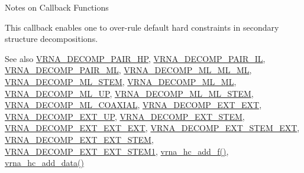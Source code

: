 \begin{DoxyRefDesc}{Notes on Callback Functions}
\item[\hyperlink{callbacks__callbacks000001}{Notes on Callback Functions}]This callback enables one to over-\/rule default hard constraints in secondary structure decompositions. \end{DoxyRefDesc}


\begin{DoxySeeAlso}{See also}
\hyperlink{group__constraints_ga8bd41ebc8039378d242e4e8c273716a5}{V\+R\+N\+A\+\_\+\+D\+E\+C\+O\+M\+P\+\_\+\+P\+A\+I\+R\+\_\+\+HP}, \hyperlink{group__constraints_gaeab04f34d7730cff2d651d782f95d857}{V\+R\+N\+A\+\_\+\+D\+E\+C\+O\+M\+P\+\_\+\+P\+A\+I\+R\+\_\+\+IL}, \hyperlink{group__constraints_gaa15b1185673f0b9e900c4748d45f388f}{V\+R\+N\+A\+\_\+\+D\+E\+C\+O\+M\+P\+\_\+\+P\+A\+I\+R\+\_\+\+ML}, \hyperlink{group__constraints_ga735517266f2e35e1374b8f1ea77ef23e}{V\+R\+N\+A\+\_\+\+D\+E\+C\+O\+M\+P\+\_\+\+M\+L\+\_\+\+M\+L\+\_\+\+ML}, \hyperlink{group__constraints_ga4a23054c75d8efc785de50e3ea87602f}{V\+R\+N\+A\+\_\+\+D\+E\+C\+O\+M\+P\+\_\+\+M\+L\+\_\+\+S\+T\+EM}, \hyperlink{group__constraints_ga7f4cb9ff7a33e67f0539bd39e7b19a78}{V\+R\+N\+A\+\_\+\+D\+E\+C\+O\+M\+P\+\_\+\+M\+L\+\_\+\+ML}, \hyperlink{group__constraints_gae6478dda14e50e2f2cb9ef333a29256e}{V\+R\+N\+A\+\_\+\+D\+E\+C\+O\+M\+P\+\_\+\+M\+L\+\_\+\+UP}, \hyperlink{group__constraints_ga63d8ceb8c96ae3b463e529e28cc0fe98}{V\+R\+N\+A\+\_\+\+D\+E\+C\+O\+M\+P\+\_\+\+M\+L\+\_\+\+M\+L\+\_\+\+S\+T\+EM}, \hyperlink{group__constraints_ga4fe48d575830b16c208e280e01ab1497}{V\+R\+N\+A\+\_\+\+D\+E\+C\+O\+M\+P\+\_\+\+M\+L\+\_\+\+C\+O\+A\+X\+I\+AL}, \hyperlink{group__constraints_ga437adf5115c1999304eff26b41e4c9b6}{V\+R\+N\+A\+\_\+\+D\+E\+C\+O\+M\+P\+\_\+\+E\+X\+T\+\_\+\+E\+XT}, \hyperlink{group__constraints_gaff1ddaffe86d984623910b40cc8a8717}{V\+R\+N\+A\+\_\+\+D\+E\+C\+O\+M\+P\+\_\+\+E\+X\+T\+\_\+\+UP}, \hyperlink{group__constraints_gae44b5ace0d9b4a29088069ecb4cec441}{V\+R\+N\+A\+\_\+\+D\+E\+C\+O\+M\+P\+\_\+\+E\+X\+T\+\_\+\+S\+T\+EM}, \hyperlink{group__constraints_ga803bd818b3f4b2b0a4a5cfa2f7dc2045}{V\+R\+N\+A\+\_\+\+D\+E\+C\+O\+M\+P\+\_\+\+E\+X\+T\+\_\+\+E\+X\+T\+\_\+\+E\+XT}, \hyperlink{group__constraints_gabb09c5b78b75a44502fc77b950125c1e}{V\+R\+N\+A\+\_\+\+D\+E\+C\+O\+M\+P\+\_\+\+E\+X\+T\+\_\+\+S\+T\+E\+M\+\_\+\+E\+XT}, \hyperlink{group__constraints_ga06efd054c9271438f6d82d4559d9e69f}{V\+R\+N\+A\+\_\+\+D\+E\+C\+O\+M\+P\+\_\+\+E\+X\+T\+\_\+\+E\+X\+T\+\_\+\+S\+T\+EM}, \hyperlink{group__constraints_ga2e75d7a77118735b32f25422d9686719}{V\+R\+N\+A\+\_\+\+D\+E\+C\+O\+M\+P\+\_\+\+E\+X\+T\+\_\+\+E\+X\+T\+\_\+\+S\+T\+E\+M1}, \hyperlink{constraints__hard_8h_af220427ba7ecc8e786a07b7799658f18}{vrna\+\_\+hc\+\_\+add\+\_\+f()}, \hyperlink{constraints__hard_8h_a128920e0af52e4196a9d59fa13336c7c}{vrna\+\_\+hc\+\_\+add\+\_\+data()}
\end{DoxySeeAlso}

